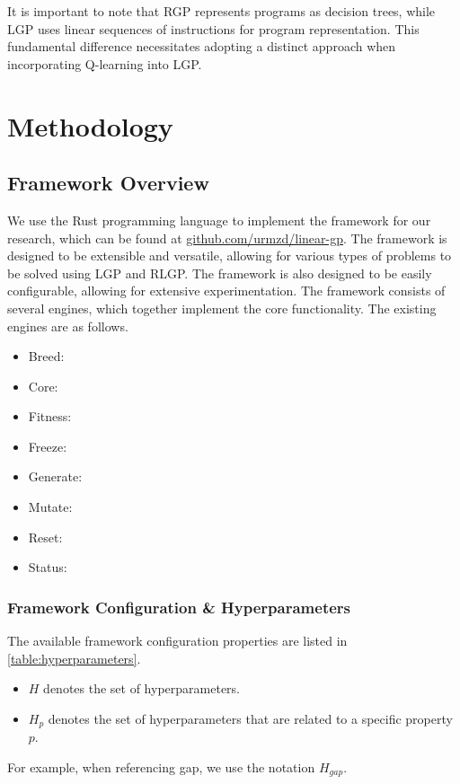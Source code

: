 \documentclass[12pt, final]{dalcsthesis}
\begin{document}
It is important to note that RGP represents programs as decision trees, while LGP uses linear sequences of instructions for program representation. This fundamental difference necessitates adopting a distinct approach when incorporating Q-learning into LGP.

\chapter{Methodology}

\section{Framework Overview}
We use the Rust programming language to implement the framework for our research, which can be found at \href{https://github.com/urmzd/linear-gp}{github.com/urmzd/linear-gp}. The framework is designed to be extensible and versatile, allowing
for various types of problems to be solved using LGP and RLGP. The framework is also designed to be easily configurable, allowing for extensive experimentation. The framework consists of several engines, which together implement the core functionality.
The existing engines are as follows.
\begin{itemize}
	\item Breed: 
	\item Core: 
	\item Fitness:
	\item Freeze:
	\item Generate:
	\item Mutate:
	\item Reset:
	\item Status:
\end{itemize}

\subsection{Framework Configuration \& Hyperparameters}

The available framework configuration properties are listed in \ref{table:hyperparameters}.

\begin{itemize}
	\item $H$ denotes the set of hyperparameters.
	\item $H_{p}$ denotes the set of hyperparameters that are related to a specific property $p$.
\end{itemize}

For example, when referencing gap, we use the notation $H_{gap}$.
\end{document}
